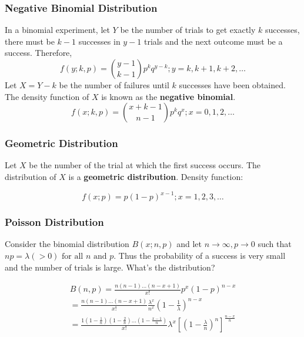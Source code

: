 \documentclass{article}
\begin{document}
\subsubsection{Negative Binomial Distribution}

In a binomial experiment, let \(Y\) be the number of trials to get exactly \(k\) successes, there must be \(k-1\) successes in \(y-1\) trials and the next outcome must be a success. Therefore,
\begin{equation*}
    f(y;k,p) = \binom{y-1}{k-1} p^k q^{y-k} ; y=k,k+1,k+2,\dots
\end{equation*}
Let \(X=Y-k\) be the number of failures until \(k\) successes have been obtained. The density function of \(X\) is known as the \textbf{negative binomial}.
\begin{equation*}
    f(x;k,p)=\binom{x+k-1}{n-1} p^k q^x ; x=0,1,2,\dots
\end{equation*}

\subsubsection{Geometric Distribution}

Let \(X\) be the number of the trial at which the first success occurs. The distribution of \(X\) is a \textbf{geometric distribution}. Density function:

\begin{equation*}
    f(x;p)=p (1-p)^{x-1} ; x=1,2,3,\dots
\end{equation*}

\subsubsection{Poisson Distribution}

Consider the binomial distribution \(B(x;n,p)\) and let \(n \rightarrow \infty, p \rightarrow 0\) such that \(np=\lambda(>0) \text{ for all } n \text{ and } p\). Thus the probability of a success is very small and the number of trials is large. What's the distribution?

\begin{equation*}
    \begin{split}
        B(n,p) = \frac{n(n-1)\dots(n-x+1)}{x!} p^x (1-p)^{n-x} \\
        = \frac{n(n-1)\dots(n-x+1)}{x!} \frac{\lambda^x}{n^x} \left(1-\frac{1}{\lambda} \right)^{n-x} \\
        = \frac{1 \left(1-\frac{1}{n}\right) \left(1-\frac{2}{n}\right) \dots \left(1-\frac{x-1}{n}\right)}{x!} \lambda^x \left[\left(1-\frac{\lambda}{n} \right)^n\right]^{\frac{n-x}{n}}
        \end{split}
\end{equation*}
\end{document}
